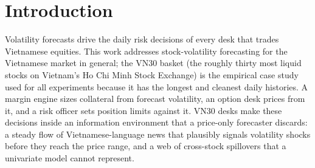 \documentclass[runningheads]{llncs}
\begin{document}
\begin{abstract}
variant the lowest at h1. Diebold--Mariano tests on the seed-ensembled predictions, run on the
QLIKE, squared-error, and absolute-error loss families, show no model favored across all three: relative
to HAR the full model shows no significant QLIKE difference at h1, h5, and h10 and significantly higher
QLIKE at h22, no significant squared-error difference at any horizon, and significantly lower absolute-error
loss at h5. The ablation removals are significant on some loss families and horizons and not others, so no
ablation verdict holds uniformly across the three losses and four horizons. Across all five metrics no
configuration consistently or significantly outperforms HAR. This paper's contribution is a leakage-safe
ablation-based attribution of a directed-spillover graph-attention news model against a strong HAR baseline
on sparse daily VN30 data.

\end{abstract}
%
\section{Introduction}
\label{sec:intro}
Volatility forecasts drive the daily risk decisions of every desk that trades Vietnamese equities. This
work addresses stock-volatility forecasting for the Vietnamese market in general; the VN30 basket (the
roughly thirty most liquid stocks on Vietnam's Ho Chi Minh Stock Exchange) is the empirical case study
used for all experiments because it has the longest and cleanest daily histories. A margin engine sizes
collateral from forecast volatility, an option desk prices from it, and a risk officer sets position limits
against it. VN30 desks make these decisions inside an information environment that a price-only forecaster
discards: a steady flow of Vietnamese-language news that plausibly signals volatility shocks before they
reach the price range, and a web of cross-stock spillovers that a univariate model cannot represent.
\end{document}
